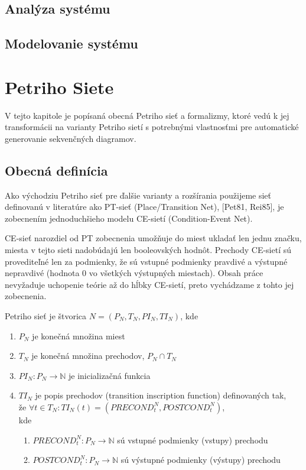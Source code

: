 \section{Analýza systému}

\section{Modelovanie systému}





\chapter{Petriho Siete}
V tejto kapitole je popísaná obecná Petriho sieť a formalizmy, ktoré vedú k jej transformácii na varianty Petriho sietí s potrebnými vlastnosťmi pre automatické generovanie sekvenčných diagramov.

\section{Obecná definícia}
Ako východziu Petriho sieť pre ďalšie varianty a rozšírania použijeme sieť definovanú v literatúre ako PT-sieť (Place/Transition Net), [Pet81, Rei85], je zobecnením jednoduchšieho modelu CE-sietí (Condition-Event Net).

\begin{note}
	CE-sieť narozdiel od PT zobecnenia umožňuje do miest ukladať len jednu značku, miesta v tejto sieti nadobúdajú len booleovských hodnôt. Prechody CE-sietí sú provediteľné len za podmienky, že sú vstupné podmienky pravdivé a výstupné nepravdivé (hodnota 0 vo všetkých výstupných miestach). Obsah práce nevyžaduje uchopenie teórie až do hĺbky CE-sietí, preto vychádzame z tohto jej zobecnenia. 
\end{note}

\begin{defn} Petriho sieť je štvorica $N = (P_N, T_N, PI_N, TI_N)$, kde \begin{enumerate}
	\item $P_N$ je konečná množina miest
	\item $T_N$ je konečná množina prechodov, $P_N \cap T_N$
	\item $PI_N : P_N \longrightarrow  \mathbb{N}$ je inicializačná funkcia
	\item $TI_N$ je popis prechodov (transition inscription function) definovaných tak,\\
	\quad že $\forall t \in T_N : TI_N(t) = (PRECOND_t^N, POSTCOND_t^N)$,\\
	kde
	\begin{enumerate}
		\item $PRECOND_t^N : P_N \longrightarrow \mathbb{N}$ sú vstupné podmienky (vstupy) prechodu
		\item $POSTCOND_t^N : P_N \longrightarrow \mathbb{N}$ sú výstupné podmienky (výstupy) prechodu
	\end{enumerate}
\end{enumerate} \end{defn}

